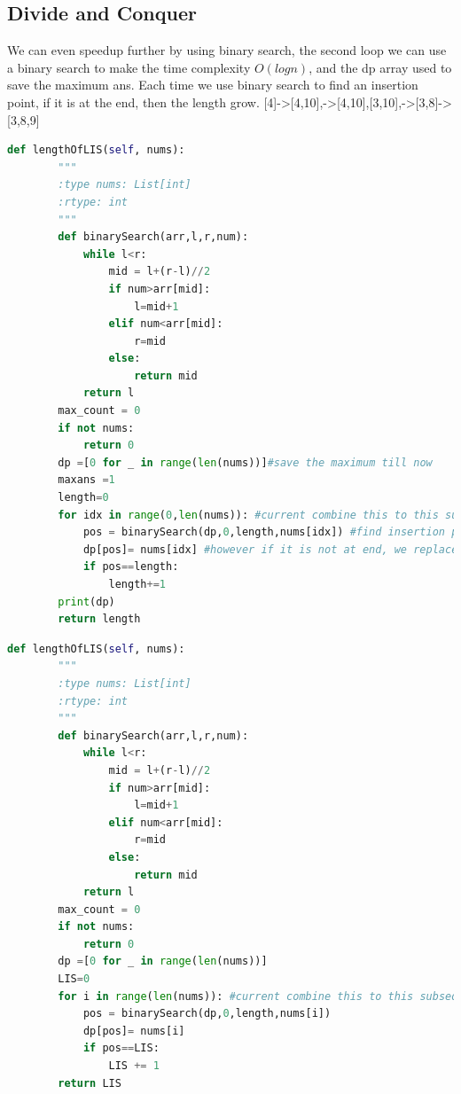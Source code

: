 \documentclass[../main.tex]{subfiles}
\begin{document}
\subsection{Divide and Conquer}
We can even speedup further by using binary search, the second loop we can use a binary search to make the time complexity $O(logn)$, and the dp array used to save the maximum ans. Each time we use binary search to find an insertion point, if it is at the end, then the length grow.
[4]->[4,10],->[4,10],[3,10],->[3,8]->[3,8,9]
\begin{lstlisting}[language = Python]
def lengthOfLIS(self, nums):
        """
        :type nums: List[int]
        :rtype: int
        """
        def binarySearch(arr,l,r,num):
            while l<r:
                mid = l+(r-l)//2
                if num>arr[mid]:
                    l=mid+1
                elif num<arr[mid]:
                    r=mid
                else:
                    return mid
            return l
        max_count = 0
        if not nums:
            return 0
        dp =[0 for _ in range(len(nums))]#save the maximum till now
        maxans =1
        length=0
        for idx in range(0,len(nums)): #current combine this to this subsequence, 10 to [], 9 to [10]
            pos = binarySearch(dp,0,length,nums[idx]) #find insertion point
            dp[pos]= nums[idx] #however if it is not at end, we replace it, current number
            if pos==length:
                length+=1
        print(dp)            
        return length
\end{lstlisting}
\begin{lstlisting}[language=Python]
    def lengthOfLIS(self, nums):
        """
        :type nums: List[int]
        :rtype: int
        """
        def binarySearch(arr,l,r,num):
            while l<r:
                mid = l+(r-l)//2
                if num>arr[mid]:
                    l=mid+1
                elif num<arr[mid]:
                    r=mid
                else:
                    return mid
            return l
        max_count = 0
        if not nums:
            return 0
        dp =[0 for _ in range(len(nums))]
        LIS=0
        for i in range(len(nums)): #current combine this to this subsequence, 10 to [], 9 to [10]
            pos = binarySearch(dp,0,length,nums[i])
            dp[pos]= nums[i]
            if pos==LIS:
                LIS += 1          
        return LIS
\end{lstlisting}
\end{document}
